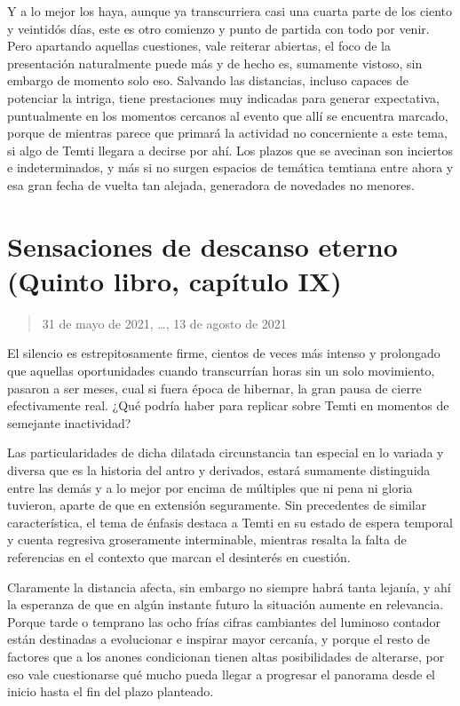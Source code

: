 \documentclass[
]{book}
\begin{document}
Y a lo mejor los haya, aunque ya transcurriera casi una cuarta parte de los ciento y veintidós días, este es otro comienzo y punto de partida con todo por venir. Pero apartando aquellas cuestiones, vale reiterar abiertas, el foco de la presentación naturalmente puede más y de hecho es, sumamente vistoso, sin embargo de momento solo eso. Salvando las distancias, incluso capaces de potenciar la intriga, tiene prestaciones muy indicadas para generar expectativa, puntualmente en los momentos cercanos al evento que allí se encuentra marcado, porque de mientras parece que primará la actividad no concerniente a este tema, si algo de Temti llegara a decirse por ahí. Los plazos que se avecinan son inciertos e indeterminados, y más si no surgen espacios de temática temtiana entre ahora y esa gran fecha de vuelta tan alejada, generadora de novedades no menores.

\hypertarget{sensaciones-de-descanso-eterno-quinto-libro-capuxedtulo-ix}{%
\section{Sensaciones de descanso eterno (Quinto libro, capítulo IX)}\label{sensaciones-de-descanso-eterno-quinto-libro-capuxedtulo-ix}}

\begin{quote}
31 de mayo de 2021, \ldots, 13 de agosto de 2021
\end{quote}

El silencio es estrepitosamente firme, cientos de veces más intenso y prolongado que aquellas oportunidades cuando transcurrían horas sin un solo movimiento, pasaron a ser meses, cual si fuera época de hibernar, la gran pausa de cierre efectivamente real. ¿Qué podría haber para replicar sobre Temti en momentos de semejante inactividad?

Las particularidades de dicha dilatada circunstancia tan especial en lo variada y diversa que es la historia del antro y derivados, estará sumamente distinguida entre las demás y a lo mejor por encima de múltiples que ni pena ni gloria tuvieron, aparte de que en extensión seguramente. Sin precedentes de similar característica, el tema de énfasis destaca a Temti en su estado de espera temporal y cuenta regresiva groseramente interminable, mientras resalta la falta de referencias en el contexto que marcan el desinterés en cuestión.

Claramente la distancia afecta, sin embargo no siempre habrá tanta lejanía, y ahí la esperanza de que en algún instante futuro la situación aumente en relevancia. Porque tarde o temprano las ocho frías cifras cambiantes del luminoso contador están destinadas a evolucionar e inspirar mayor cercanía, y porque el resto de factores que a los anones condicionan tienen altas posibilidades de alterarse, por eso vale cuestionarse qué mucho pueda llegar a progresar el panorama desde el inicio hasta el fin del plazo planteado.
\end{document}
